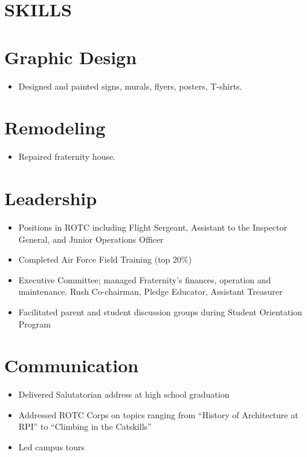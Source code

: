 \begin{resume}
\section{SKILLS} 
\normalsize{\section{Graphic Design}}
                 \begin{itemize}
                 \item Designed and painted signs, murals, flyers, 
                  posters, T-shirts. 
                 \end{itemize}
\normalsize{\section{Remodeling}} 
                 \begin{itemize}
                  \item Repaired fraternity house. 
                  \end{itemize}
\normalsize{\section{Leadership}}
	           \begin{itemize} \itemsep -2pt %
                   \item Positions in ROTC including Flight Sergeant, 
                    Assistant to the Inspector General, and 
                    Junior Operations Officer 
                  \item Completed Air Force Field Training
                       (top 20\%) 
                  \item Executive Committee; managed 
                  Fraternity's finances, operation and
                  maintenance. Rush Co-chairman, Pledge
                  Educator, Assistant Treasurer 
                   \item Facilitated parent and student discussion 
                    groups during Student Orientation Program 
                   \end{itemize}
\normalsize{\section{Communication}} 
                  \begin{itemize} \itemsep -2pt
                  \item Delivered Salutatorian address at high school 
                    graduation 
                  \item  Addressed ROTC Corps on topics ranging from 
                    ``History of Architecture at RPI'' to ``Climbing 
                    in the Catskills'' 
                  \item  Led campus tours 
                  \end{itemize} 
 

\end{resume}
